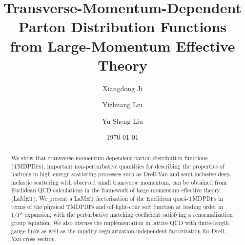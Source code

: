 \documentclass[twocolumn,aps,prd,preprintnumbers,superscriptaddress,10pt]{revtex4-1}
\begin{document}
\title{Transverse-Momentum-Dependent Parton Distribution Functions \\ from Large-Momentum Effective Theory}

\author{Xiangdong Ji}


\author{Yizhuang Liu}

\author{Yu-Sheng Liu}

\date{\today}

\begin{abstract}
We show that transverse-momentum-dependent parton distribution functions (TMDPDFs), important non-perturbative
quantities for describing the properties of hadrons in high-energy scattering processes such as Drell-Yan and semi-inclusive deep-inelastic scattering with observed small transverse momentum, can be obtained from Euclidean QCD calculations in the framework of large-momentum effective theory (LaMET).
%
We present a LaMET factorization of the Euclidean quasi-TMDPDFs in terms of the physical TMDPDFs and off-light-cone
soft function at leading order in $1/P^z$ expansion, with the perturbative matching coefficient satisfying a renormalization group equation.
%
We also discuss the implementation in lattice QCD with finite-length gauge links as well as the rapidity-regularization-independent factorization
for Drell-Yan cross section.
\end{abstract}

\maketitle
\end{document}
